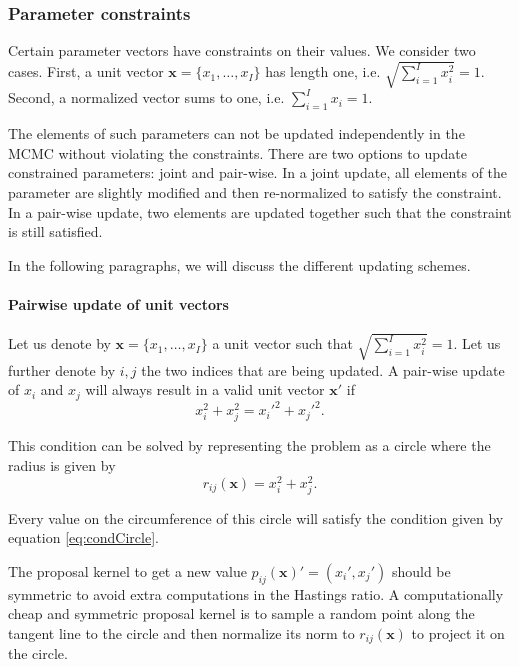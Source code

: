 \documentclass[a4paper,11pt]{article}
\def\x{\boldsymbol{x}}
\begin{document}
\subsubsection{Parameter constraints}

Certain parameter vectors have constraints on their values. We consider two cases. First, a unit vector $\x = \{x_1, \ldots, x_I\}$ has length one, i.e. $\sqrt{\sum_{i=1}^I x_i^2} = 1$. Second, a normalized vector sums to one, i.e. $\sum_{i=1}^I x_i = 1$.

The elements of such parameters can not be updated independently in the MCMC without violating the constraints. There are two options to update constrained parameters: joint and pair-wise. In a joint update, all elements of the parameter are slightly modified and then re-normalized to satisfy the constraint. In a pair-wise update, two elements are updated together such that the constraint is still satisfied.

In the following paragraphs, we will discuss the different updating schemes.

\paragraph{Pairwise update of unit vectors}

Let us denote by $\x = \{x_1, \ldots, x_I\}$ a unit vector such that $\sqrt{\sum_{i=1}^I x_i^2} = 1$. Let us further denote by $i,j$ the two indices that are being updated. A pair-wise update of $x_{i}$ and $x_{j}$ will always result in a valid unit vector $\x'$ if
\begin{equation}\label{eq:condCircle}
 x_{i}^2 + x_{j}^2 = x_{i}'^2 + x_{j}'^2.
\end{equation}

This condition can be solved by representing the problem as a circle where the radius is given by
\begin{equation*}
 r_{ij}(\x) = x_{i}^2 + x_{j}^2.
\end{equation*}

Every value on the circumference of this circle will satisfy the condition given by equation \eqref{eq:condCircle}.

The proposal kernel to get a new value $p_{ij}(\x)' =(x_{i}', x_{j}')$ should be symmetric to avoid extra computations in the Hastings ratio. A computationally cheap and symmetric proposal kernel is to sample a random point along the tangent line to the circle and then normalize its norm to $r_{ij}(\x)$ to project it on the circle.
\end{document}
